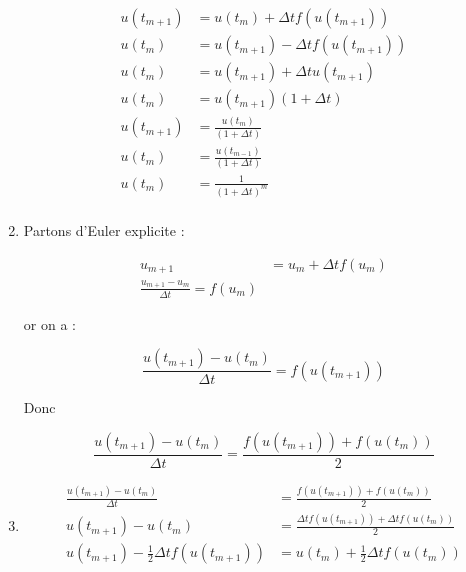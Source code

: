 \documentclass[12pt, letterpaper]{article}
\begin{document}
\begin{enumerate}
  \begin{equation*}
    \begin{split}
      u(t_{m+1}) & = u(t_m) + \Delta t f(u(t_{m+1})) \\
      u(t_m) & = u(t_{m+1}) - \Delta t f(u(t_{m+1})) \\
      u(t_m) & = u(t_{m+1}) + \Delta t u(t_{m+1}) \\
      u(t_m) & = u(t_{m+1}) (1 + \Delta t) \\
      u(t_{m+1}) & = \frac{u(t_m)}{(1 + \Delta t)} \\
      u(t_m) & = \frac{u(t_{m-1})}{(1 + \Delta t)} \\
      u(t_m) & = \frac{1}{(1 + \Delta t)^m} \\
    \end{split}
  \end{equation*}


\item
  Partons d'Euler explicite :

  \begin{equation*}
    \begin{split}
      u_{m+1} & = u_m + \Delta t f(u_m) \\
      \frac{u_{m+1} - u_m}{\Delta t} = f(u_m)
    \end{split}
  \end{equation*}

  or on a :

  \begin{equation*}
    \frac{u(t_{m + 1}) - u(t_m)}{\Delta t} = f(u(t_{m+1}))
  \end{equation*}

  Donc

  \begin{equation*}
    \frac{u(t_{m + 1}) - u(t_m)}{\Delta t} = \frac{f(u(t_{m+1})) + f(u(t_m))}{2}
  \end{equation*}

    
\item

  \begin{equation*}
    \begin{split}
      \frac{u(t_{m + 1}) - u(t_m)}{\Delta t} & = \frac{f(u(t_{m+1})) +
        f(u(t_m))}{2} \\
      u(t_{m + 1}) - u(t_m) & = \frac{\Delta t f(u(t_{m+1})) +
        \Delta t f(u(t_m))}{2} \\
      u(t_{m + 1}) - \frac{1}{2} \Delta t f(u(t_{m+1})) & = u(t_m) +
      \frac{1}{2} \Delta t f(u(t_m)) \\
    \end{split}
  \end{equation*}


\end{enumerate}
\end{document}
